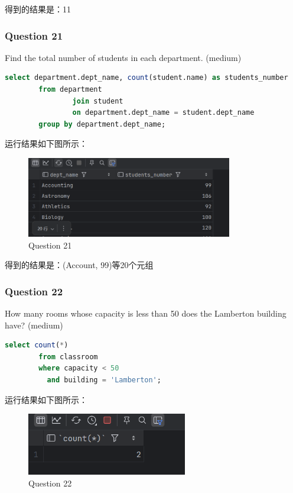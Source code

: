 \documentclass{article}
\begin{document}
    得到的结果是：11
    
    \subsubsection{Question 21}
    
    Find the total number of students in each department.  (medium)
    
    \begin{lstlisting}[language=sql, title=Question 21, tabsize=4]
    	select department.dept_name, count(student.name) as students_number
    	from department
    			join student
    			on department.dept_name = student.dept_name
    	group by department.dept_name;
    \end{lstlisting}
    
    运行结果如下图所示：
    
    \begin{figure}[H]
    	\centering
    	\includegraphics[width=9cm]{./images/25.Question21.png}
    	\caption{Question 21}
    \end{figure}
    
    得到的结果是：(Account, 99)等20个元组
    
    \subsubsection{Question 22}
    
    How many rooms whose capacity is less than 50 does the Lamberton building have?  (medium)
    
    \begin{lstlisting}[language=sql, title=Question 22, tabsize=4]
    	select count(*)
    	from classroom
    	where capacity < 50
    	  and building = 'Lamberton';
    \end{lstlisting}
    
    运行结果如下图所示：
    
    \begin{figure}[H]
    	\centering
    	\includegraphics[width=7cm]{./images/26.Question22.png}
    	\caption{Question 22}
    \end{figure}
    
\end{document}
